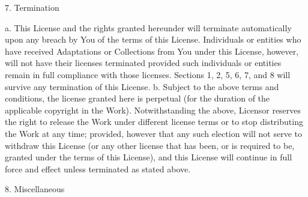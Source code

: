7. Termination

 a. This License and the rights granted hereunder will terminate
    automatically upon any breach by You of the terms of this License.
    Individuals or entities who have received Adaptations or Collections
    from You under this License, however, will not have their licenses
    terminated provided such individuals or entities remain in full
    compliance with those licenses. Sections 1, 2, 5, 6, 7, and 8 will
    survive any termination of this License.
 b. Subject to the above terms and conditions, the license granted here is
    perpetual (for the duration of the applicable copyright in the Work).
    Notwithstanding the above, Licensor reserves the right to release the
    Work under different license terms or to stop distributing the Work at
    any time; provided, however that any such election will not serve to
    withdraw this License (or any other license that has been, or is
    required to be, granted under the terms of this License), and this
    License will continue in full force and effect unless terminated as
    stated above.

8. Miscellaneous

